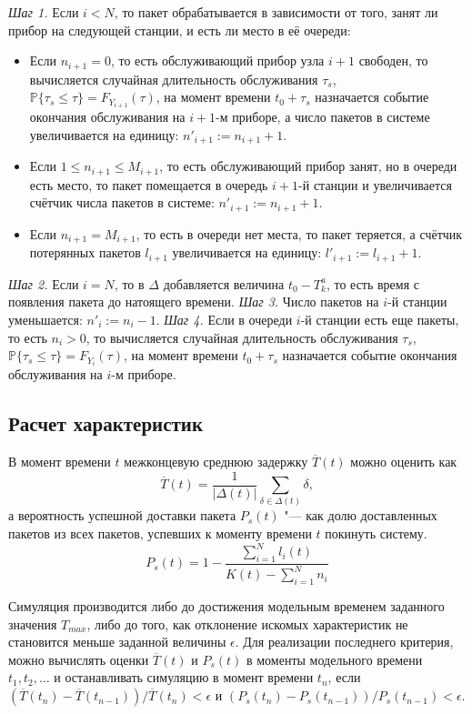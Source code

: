 \textit{Шаг 1.} Если $i < N$, то пакет обрабатывается в зависимости от того, занят ли прибор на следующей станции, и есть ли место в её очереди:
\begin{itemize}
\item Если $n_{i+1} = 0$, то есть обслуживающий прибор узла $i+1$ свободен, то вычисляется случайная длительность обслуживания $\tau_s$, $\mathbb{P}\{\tau_s \leqslant \tau\} = F_{Y_{i+1}}(\tau)$, на момент времени $t_0 + \tau_s$ назначается событие окончания обслуживания на $i+1$-м приборе, а число пакетов в системе увеличивается на единицу: $n'_{i+1} := n_{i+1} + 1$.
\item Если $1 \leqslant n_{i+1} \leqslant M_{i+1}$, то есть обслуживающий прибор занят, но в очереди есть место, то пакет помещается в очередь $i+1$-й станции и увеличивается счётчик числа пакетов в системе: $n'_{i+1} := n_{i+1} + 1$.
\item Если $n_{i+1} = M_{i+1}$, то есть в очереди нет места, то пакет теряется, а счётчик потерянных пакетов $l_{i+1}$ увеличивается на единицу: $l'_{i+1} := l_{i+1} + 1$.
\end{itemize}

\textit{Шаг 2.} Если $i = N$, то в $\Delta$ добавляется величина $t_0 - T_k^a$, то есть время с появления пакета до натоящего времени.
\textit{Шаг 3.} Число пакетов на $i$-й станции уменьшается: $n'_i := n_i - 1$.
\textit{Шаг 4.} Если в очереди $i$-й станции есть еще пакеты, то есть $n_i > 0$, то вычисляется случайная длительность обслуживания $\tau_s$, $\mathbb{P}\{\tau_s \leqslant \tau\} = F_{Y_i}(\tau)$, на момент времени $t_0 + \tau_s$ назначается событие окончания обслуживания на $i$-м приборе.



\subsection{Расчет характеристик}

В момент времени $t$ межконцевую среднюю задержку $\overline{T}(t)$ можно оценить как
$$
\overline{T}(t) = \frac{1}{|\Delta(t)|}\sum\limits_{\delta \in \Delta(t)} \delta,
$$
а вероятность успешной доставки пакета $P_s(t)$ "--- как долю доставленных пакетов из всех пакетов, успевших к моменту времени $t$ покинуть систему.
$$
P_s(t) = 1 - \frac{\sum\limits_{i=1}^{N} l_i(t)}{K(t) - \sum\limits_{i=1}^{N} n_i}
$$

Симуляция производится либо до достижения модельным временем заданного значения $T_{max}$, либо до того, как отклонение искомых характеристик не становится меньше заданной величины $\epsilon$. Для реализации последнего критерия, можно вычислять оценки $\overline{T}(t)$ и $P_s(t)$ в моменты модельного времени $t_1, t_2, \dots$ и останавливать симуляцию в момент времени $t_n$, если $\left(\overline{T}(t_n) - \overline{T}(t_{n-1}) \right) / \overline{T}(t_n) < \epsilon$ и $\left( P_s(t_n) - P_s(t_{n-1}) \right) / P_s(t_{n-1}) < \epsilon$.

